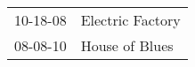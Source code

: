 \begin{supertabular}{p{0.07\textwidth}p{0.23\textwidth}}
 10-18-08 &  Electric Factory \\
 08-08-10 &    House of Blues \\
\end{supertabular}
